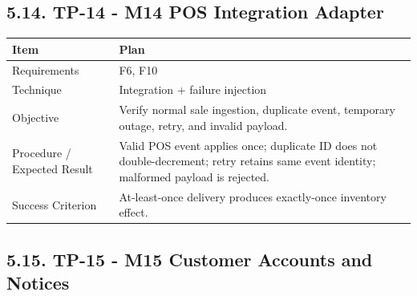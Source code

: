 \subsection{5.14. TP-14 - M14 POS Integration Adapter}\label{tp-14---m14-pos-integration-adapter}

{\def\LTcaptype{none} %
\begin{longtable}[]{|
  >{\raggedright\arraybackslash}m{}|
  >{\raggedright\arraybackslash}m{}|}
\hline
\begin{minipage}[c]{\linewidth}\raggedright
\textbf{Item}
\end{minipage} & \begin{minipage}[c]{\linewidth}\raggedright
\textbf{Plan}
\end{minipage} \\
\hline
\endhead

\endlastfoot
Requirements & F6, F10 \\ \hline
Technique & Integration + failure injection \\ \hline
Objective & Verify normal sale ingestion, duplicate event, temporary outage, retry, and invalid payload. \\ \hline
Procedure / Expected Result & Valid POS event applies once; duplicate ID does not double-decrement; retry retains same event identity; malformed payload is rejected. \\ \hline
Success Criterion & At-least-once delivery produces exactly-once inventory effect. \\ \hline
\end{longtable}
}

\subsection{5.15. TP-15 - M15 Customer Accounts and Notices}\label{tp-15---m15-customer-accounts-and-notices}

